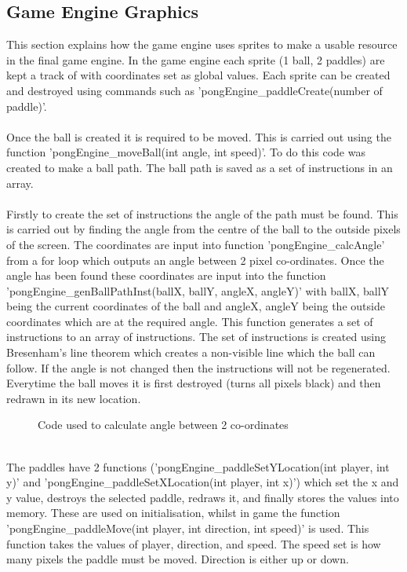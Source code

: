 \documentclass[a4paper,12pt]{article}
\begin{document}
\subsection{Game Engine Graphics}
\begin{flushleft}
This section explains how the game engine uses sprites to make a usable resource in the final game engine. In the game engine each sprite (1 ball, 2 paddles) are kept a track of with coordinates set as global values. Each sprite can be created and destroyed using commands such as 'pongEngine\_paddleCreate(number of paddle)'. 
\\ \- \\
Once the ball is created it is required to be moved. This is carried out using the function 'pongEngine\_moveBall(int angle, int speed)'. To do this code was created to make a ball path. The ball path is saved as a set of instructions in an array. \\ \- \\Firstly to create the set of instructions the angle of the path must be found. This is carried out by finding the angle from the centre of the ball to the outside pixels of the screen. The coordinates are input into function 'pongEngine\_calcAngle' from a for loop which outputs an angle between 2 pixel co-ordinates. Once the angle has been found these coordinates are input into the function 'pongEngine\_genBallPathInst(ballX, ballY, angleX, angleY)' with ballX, ballY being the current coordinates of the ball and angleX, angleY being the outside coordinates which are at the required angle. This function generates a set of instructions to an array of instructions. The set of instructions is created using Bresenham's line theorem which creates a non-visible line which the ball can follow. If the angle is not changed then the instructions will not be regenerated. Everytime the ball moves it is first destroyed (turns all pixels black) and then redrawn in its new location. 
\begin{figure}[H]
	\centering
	
		\caption{Code used to calculate angle between 2 co-ordinates}
\end{figure}
\- \\
The paddles have 2 functions ('pongEngine\_paddleSetYLocation(int player, int y)' and 'pongEngine\_paddleSetXLocation(int player, int x)') which set the x and y value, destroys the selected paddle, redraws it, and finally stores the values into memory. These are used on initialisation, whilst in game the function 'pongEngine\_paddleMove(int player, int direction, int speed)' is used. This function takes the values of player, direction, and speed. The speed set is how many pixels the paddle must be moved. Direction is either up or down.

\end{flushleft}
\end{document}
